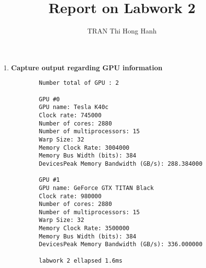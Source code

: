 \documentclass{article}
\title{Report on Labwork 2}
\author{TRAN Thi Hong Hanh}
\begin{document}
\maketitle
\begin{enumerate}
    \item \textbf{Capture output regarding GPU information}
    \begin{verbatim}
        Number total of GPU : 2

        GPU #0
        GPU name: Tesla K40c
        Clock rate: 745000
        Number of cores: 2880
        Number of multiprocessors: 15
        Warp Size: 32
        Memory Clock Rate: 3004000
        Memory Bus Width (bits): 384
        DevicesPeak Memory Bandwidth (GB/s): 288.384000
        
        GPU #1
        GPU name: GeForce GTX TITAN Black
        Clock rate: 980000
        Number of cores: 2880
        Number of multiprocessors: 15
        Warp Size: 32
        Memory Clock Rate: 3500000
        Memory Bus Width (bits): 384
        DevicesPeak Memory Bandwidth (GB/s): 336.000000
        
        labwork 2 ellapsed 1.6ms

    \end{verbatim}

\end{enumerate}
\end{document}
